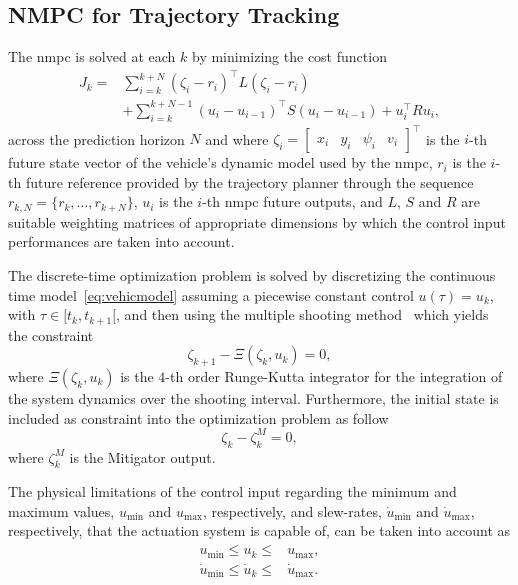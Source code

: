 \subsection{NMPC for Trajectory Tracking}
\label{subsec:NMPC}
%
The \gls{nmpc} is solved at each $k$ by minimizing the cost function
\begin{align}\label{eq:J}
	\nonumber J_k=&\sum_{i=k}^{k+N}(\zeta_i-r_i)^\top L(\zeta_i-r_i)\\&+\sum_{i=k}^{k+N-1} (u_i-u_{i-1})^\top S(u_i-u_{i-1}) + u_i^\top R u_i,
\end{align}
across the prediction horizon $N$ and where \mbox{$\zeta_{i}=\begin{bmatrix} x_i & y_i & \psi_i & v_i \end{bmatrix}^\top$} is the $i$-th future state vector of the vehicle's dynamic model used by the \gls{nmpc}, $r_i$ is the $i$-th future reference provided by the trajectory planner through the sequence $r_{k,N} = \big\{r_k, \ldots, r_{k+N}\big\}$, $u_i$ is the $i$-th \gls{nmpc} future outputs, and $L$, $S$ and $R$ are suitable weighting matrices of appropriate dimensions by which the control input performances are taken into account. 

The discrete-time optimization problem is solved by discretizing the continuous time model~\eqref{eq:vehicmodel} assuming a piecewise constant control $u(\tau)=u_k$, with $\tau \in \big[t_k,t_{k+1}\big[$, and then using the multiple shooting method~\cite{NMPC_1} which yields the constraint
\begin{equation}\label{eq:con_integrator}
	\zeta_{k+1}-\Xi(\zeta_k,u_k) = 0,
\end{equation}
where $\Xi(\zeta_k,u_k)$ is the $4$-th order Runge-Kutta integrator for the integration of the system dynamics over the shooting interval. Furthermore, the initial state is included as constraint into the optimization problem as follow
\begin{equation}\label{eq:con_init}
	\zeta_k -{\zeta}^M_{k}=0,
\end{equation}
where ${\zeta}^M_{k}$ is the Mitigator output.



The physical limitations of the control input regarding the  minimum  and  maximum values, $u_{\mathrm{min}}$ and $u_{\mathrm{max}}$, respectively, and slew-rates, $\dot{u}_{\mathrm{min}}$ and $\dot{u}_{\mathrm{max}}$, respectively, that the actuation system is capable of, can be taken into account as
\begin{subequations}\label{eq:con_u_tot}
	\begin{align}
		u_{\mathrm{min}} \leq u_k  \leq& u_{\mathrm{max}},\label{eq:con_u}\\
		\dot u_{\mathrm{min}} \leq \dot{u}_k \leq& \dot{u}_{\mathrm{max}}.\label{eq:con_dot_u}
	\end{align}
\end{subequations}


